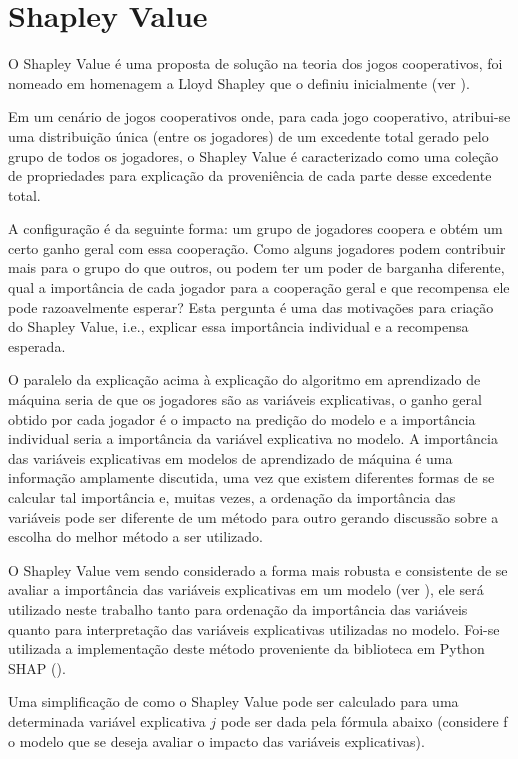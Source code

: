 \section{Shapley Value}
\label{sec:shapley_value}

O Shapley Value é uma proposta de solução na teoria dos jogos cooperativos, foi nomeado em homenagem a Lloyd Shapley que o definiu inicialmente (ver \citet{Shapley1953}).

Em um cenário de jogos cooperativos onde, para cada jogo cooperativo, atribui-se uma distribuição única (entre os jogadores) de um excedente total gerado pelo grupo de todos os jogadores, o Shapley Value é caracterizado como uma coleção de propriedades para explicação da proveniência de cada parte desse excedente total.

A configuração é da seguinte forma: um grupo de jogadores coopera e obtém um certo ganho geral com essa cooperação. Como alguns jogadores podem contribuir mais para o grupo do que outros, ou podem ter um poder de barganha diferente, qual a importância de cada jogador para a cooperação geral e que recompensa ele pode razoavelmente esperar? Esta pergunta é uma das motivações para criação do Shapley Value, i.e., explicar essa importância individual e a recompensa esperada.

O paralelo da explicação acima à explicação do algoritmo em aprendizado de máquina seria de que os jogadores são as variáveis explicativas, o ganho geral obtido por cada jogador é o impacto na predição do modelo e a importância individual seria a importância da variável explicativa no modelo. A importância das variáveis explicativas em modelos de aprendizado de máquina é uma informação amplamente discutida, uma vez que existem diferentes formas de se calcular tal importância e, muitas vezes, a ordenação da importância das variáveis pode ser diferente de um método para outro gerando discussão sobre a escolha do melhor método a ser utilizado.

O Shapley Value vem sendo considerado a forma mais robusta e consistente de se avaliar a importância das variáveis explicativas em um modelo (ver \citet{Lundberg2017}), ele será utilizado neste trabalho tanto para ordenação da importância das variáveis quanto para interpretação das variáveis explicativas utilizadas no modelo. Foi-se utilizada a implementação deste método proveniente da biblioteca em Python SHAP (\citet{Shap}).

Uma simplificação de como o Shapley Value pode ser calculado para uma determinada variável explicativa $j$ pode ser dada pela fórmula abaixo (considere f o modelo que se deseja avaliar o impacto das variáveis explicativas).

